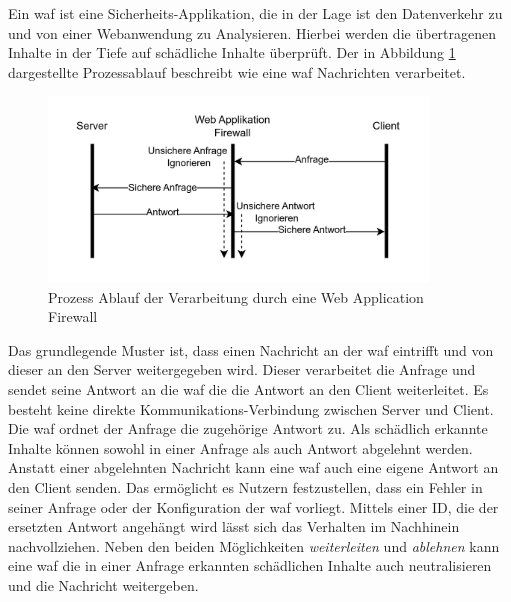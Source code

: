 \label{sec:waf-theory}
Ein \ac{waf} ist eine Sicherheits-Applikation, die in der Lage ist den Datenverkehr zu und von einer Webanwendung zu Analysieren.
Hierbei werden die übertragenen Inhalte in der Tiefe auf schädliche Inhalte überprüft.
Der in Abbildung \ref{fig:waf-porcess-flow} dargestellte Prozessablauf beschreibt wie eine \ac{waf} Nachrichten verarbeitet.

\begin{figure}[!hbt]
    \centering
    \includegraphics[width=0.9\textwidth]{./images/Waf-Process-fliow.png}
    \caption{Prozess Ablauf der Verarbeitung durch eine Web Application Firewall}
    \label{fig:waf-porcess-flow}
\end{figure}

Das grundlegende Muster ist, dass einen Nachricht an der \ac{waf} eintrifft und von dieser an den Server weitergegeben wird.
Dieser verarbeitet die Anfrage und sendet seine Antwort an die \ac{waf} die die Antwort an den Client weiterleitet.
Es besteht keine direkte Kommunikations-Verbindung zwischen Server und Client.
Die \ac{waf} ordnet der Anfrage die zugehörige Antwort zu.
Als schädlich erkannte Inhalte können sowohl in einer Anfrage als auch Antwort abgelehnt werden.
Anstatt einer abgelehnten Nachricht kann eine \ac{waf} auch eine eigene Antwort an den Client senden.
Das ermöglicht es Nutzern festzustellen, dass ein Fehler in seiner Anfrage oder der Konfiguration der \ac{waf} vorliegt.
Mittels einer ID, die der ersetzten Antwort angehängt wird lässt sich das Verhalten im Nachhinein nachvollziehen.
Neben den beiden Möglichkeiten \textit{weiterleiten} und \textit{ablehnen} kann eine \ac{waf} die in einer Anfrage erkannten schädlichen Inhalte auch neutralisieren und die Nachricht weitergeben\cite{schmitzGrundlagenWebApplication2018}.\\

